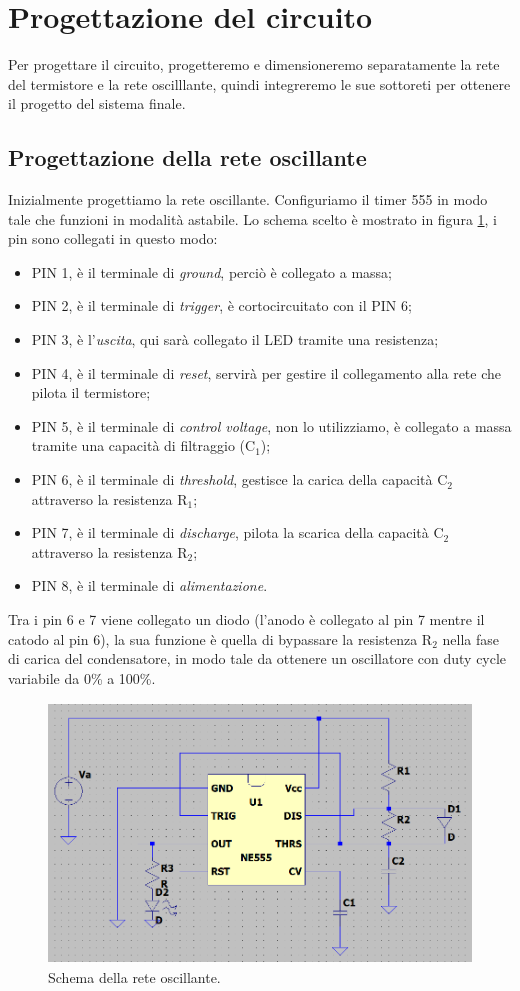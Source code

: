 \documentclass{report}
\begin{document}
\newpage
\section{Progettazione del circuito}
Per progettare il circuito, progetteremo e dimensioneremo separatamente la rete del termistore e la rete oscilllante, quindi integreremo le sue sottoreti per ottenere il progetto del sistema finale.
\subsection{Progettazione della rete oscillante}
Inizialmente progettiamo la rete oscillante. Configuriamo il timer 555 in modo tale che funzioni in modalità astabile. Lo schema scelto è mostrato in figura \ref{figura:schema555}, i pin sono collegati in questo modo:
\begin{itemize}
\item PIN 1, è il terminale di \textit{ground}, perciò è collegato a massa;
\item PIN 2, è il terminale di \textit{trigger}, è cortocircuitato con il PIN 6;
\item PIN 3, è l'\textit{uscita}, qui sarà collegato il LED tramite una resistenza;
\item PIN 4, è il terminale di \textit{reset}, servirà per gestire il collegamento alla rete che pilota il termistore;
\item PIN 5, è il terminale di \textit{control voltage}, non lo utilizziamo, è collegato a massa tramite una capacità di filtraggio ($\mathrm{C_1}$);
\item PIN 6, è il terminale di \textit{threshold}, gestisce la carica della capacità $\mathrm{C_2}$ attraverso la resistenza $\mathrm{R_1}$;
\item PIN 7, è il terminale di \textit{discharge}, pilota la scarica della capacità $\mathrm{C_2}$ attraverso la resistenza $\mathrm{R_2}$;
\item PIN 8, è il terminale di \textit{alimentazione}. 
\end{itemize} 
Tra i pin 6 e 7 viene collegato un diodo (l'anodo è collegato al pin 7 mentre il catodo al pin 6), la sua funzione è quella di bypassare la resistenza $\mathrm{R_2}$ nella fase di carica del condensatore, in modo tale da ottenere un oscillatore con duty cycle variabile da 0\% a 100\%. 
\begin{figure}[h!]
	\centering
	\includegraphics[height=6.9cm]{immagini/schema555}
	\caption{Schema della rete oscillante.} 
	\label{figura:schema555}
\end{figure}
\end{document}
